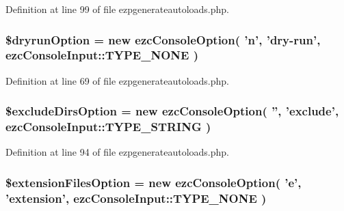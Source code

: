 Definition at line 99 of file ezpgenerateautoloads.\-php.

\hypertarget{ezpgenerateautoloads_8php_a2157a552be64e9a75918a23fef9e26e7}{
\subsubsection[{\$dryrun\-Option}]{\setlength{\rightskip}{0pt plus 5cm}\$dryrun\-Option = new ezc\-Console\-Option( 'n', 'dry-\/run', ezc\-Console\-Input\-::\-T\-Y\-P\-E\-\_\-\-N\-O\-N\-E )}}\label{ezpgenerateautoloads_8php_a2157a552be64e9a75918a23fef9e26e7}


Definition at line 69 of file ezpgenerateautoloads.\-php.

\hypertarget{ezpgenerateautoloads_8php_ad444c7af1932b7a85e8351702c783790}{
\subsubsection[{\$exclude\-Dirs\-Option}]{\setlength{\rightskip}{0pt plus 5cm}\$exclude\-Dirs\-Option = new ezc\-Console\-Option( '', 'exclude', ezc\-Console\-Input\-::\-T\-Y\-P\-E\-\_\-\-S\-T\-R\-I\-N\-G )}}\label{ezpgenerateautoloads_8php_ad444c7af1932b7a85e8351702c783790}


Definition at line 94 of file ezpgenerateautoloads.\-php.

\hypertarget{ezpgenerateautoloads_8php_a35b967cec5da82cfa9989e036ad50642}{
\subsubsection[{\$extension\-Files\-Option}]{\setlength{\rightskip}{0pt plus 5cm}\$extension\-Files\-Option = new ezc\-Console\-Option( 'e', 'extension', ezc\-Console\-Input\-::\-T\-Y\-P\-E\-\_\-\-N\-O\-N\-E )}}\label{ezpgenerateautoloads_8php_a35b967cec5da82cfa9989e036ad50642}


